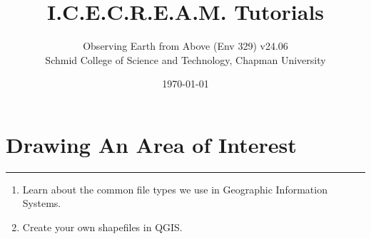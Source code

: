 \documentclass[oneside,a4paper,11pt,explicit]{book}
\title{I.C.E.C.R.E.A.M. Tutorials}
\subtitle{\small Observing Earth from Above (Env 329) v24.06  \\
	\small Schmid College of Science and Technology, Chapman University}
\date{\today}
\begin{document}
	
\dominitoc
	
\faketableofcontents
	
\setcounter{chapter}{2} %
	
\chapter{Drawing An Area of Interest} %
	
\vspace{-2em}
	
\minitoc
	
\hrule
	
\vspace{1em}
	
\begin{tcolorbox}[enhanced,frame style image=blueshade.png, opacityback=0.75,opacitybacktitle=0.25,colback=blue!5!white,colframe=blue!75!black,title={\Large \textbf{Objectives:}}]
	\large
	\begin{enumerate}
		\item Learn about the common file types we use in Geographic Information Systems.
		\item Create your own shapefiles in QGIS.
	\end{enumerate}
\end{tcolorbox}
	
\clearpage
	
\end{document}
